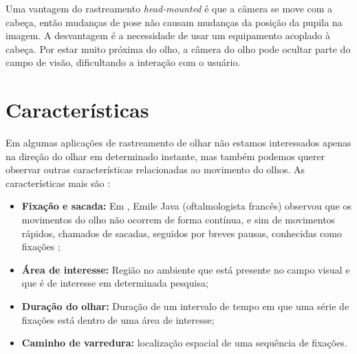 Uma vantagem do rastreamento \textit{head-mounted} é que a câmera se move com a cabeça, então mudanças de pose não causam mudanças da posição da pupila na imagem. A desvantagem é a necessidade de usar um equipamento acoplado à cabeça. Por estar muito próxima do olho, a câmera do olho pode ocultar parte do campo de visão, dificultando a interação com o usuário.

\section{Características }

Em algumas aplicações de rastreamento de olhar não estamos interessados apenas na direção do olhar em determinado instante, mas também podemos querer observar outras características relacionadas ao movimento do olhos. As características mais  são \cite{lupung}:

\begin{itemize}
\item {\bf Fixação e sacada:} Em , Emile Java (oftalmologista francês) observou que os movimentos do olho não ocorrem de forma contínua, e sim de movimentos rápidos, chamados de sacadas, seguidos por breves pausas, conhecidas como fixações \cite{lupung};

\item {\bf Área de interesse:} Região no ambiente que está presente no campo visual e que é de interesse em determinada pesquisa;

\item {\bf Duração do olhar:} Duração de um intervalo de tempo em que uma série de fixações está dentro de uma área de interesse;

\item {\bf Caminho de varredura:} localização espacial de uma sequência de fixações.
\end{itemize}
